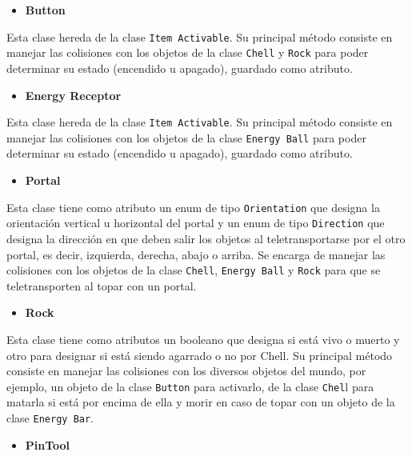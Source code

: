 \documentclass[a4paper]{article}
\begin{document}
\begin{itemize}
	\item \textbf{Button}
\end{itemize}

Esta clase hereda de la clase \texttt{Item Activable}. Su principal método consiste en manejar las colisiones con los objetos de la clase \texttt{Chell} y \texttt{Rock} para poder determinar su estado (encendido u apagado), guardado como atributo.

\begin{itemize}
	\item \textbf{Energy Receptor}
\end{itemize}

Esta clase hereda de la clase \texttt{Item Activable}. Su principal método consiste en manejar las colisiones con los objetos de la clase \texttt{Energy Ball} para poder determinar su estado (encendido u apagado), guardado como atributo.

\begin{itemize}
	\item \textbf{Portal}
\end{itemize}

Esta clase tiene como atributo un enum de tipo \texttt{Orientation} que designa la orientación vertical u horizontal del portal y un enum de tipo \texttt{Direction} que designa la dirección en que deben salir los objetos al teletransportarse por el otro portal, es decir, izquierda, derecha, abajo o arriba. Se encarga de manejar las colisiones con los objetos de la clase \texttt{Chell}, \texttt{Energy Ball} y \texttt{Rock} para que se teletransporten al topar con un portal.

\begin{itemize}
	\item \textbf{Rock}
\end{itemize}

Esta clase tiene como atributos un booleano que designa si está vivo o muerto y otro para designar si está siendo agarrado o no por Chell. Su principal método consiste en manejar las colisiones con los diversos objetos del mundo, por ejemplo, un objeto de la clase \texttt{Button} para activarlo, de la clase \texttt{Chel}l para matarla si está por encima de ella y morir en caso de topar con un objeto de la clase \texttt{Energy Bar}.

\begin{itemize}
	\item \textbf{PinTool}
\end{itemize}
\end{document}
